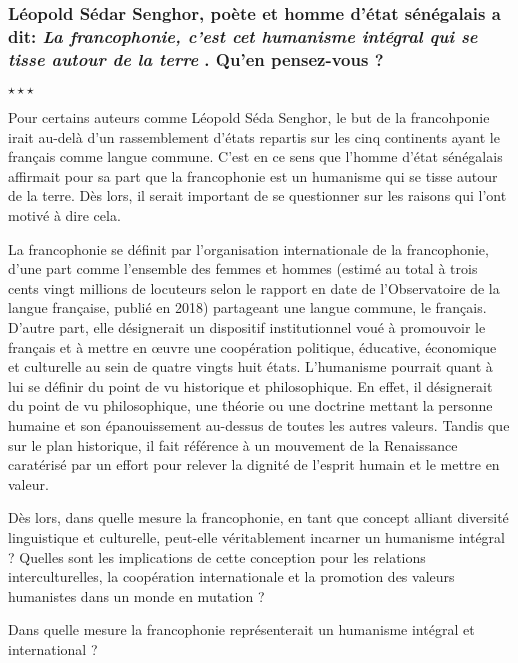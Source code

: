 \newpage \begin{center}
	\subsubsection*{Léopold Sédar Senghor, poète et homme d’état sénégalais a dit: \guillemetleft \textit{La francophonie, c’est cet humanisme intégral qui se tisse autour de la terre} \guillemetright. Qu’en pensez-vous ? }
	$\star \star \star$
\end{center}

Pour certains auteurs comme Léopold Séda Senghor, le but de la francohponie irait au-delà d'un rassemblement d'états repartis sur les cinq continents ayant le français comme langue commune. C'est en ce sens que l'homme d'état sénégalais affirmait pour sa part que la francophonie est un humanisme qui se tisse autour de la terre. Dès lors, il serait important de se questionner sur les raisons qui l'ont motivé à dire cela.

La francophonie se définit par l'organisation internationale de la francophonie, d'une part comme l'ensemble des femmes et hommes (estimé au total à trois cents vingt millions de locuteurs selon le rapport en date de l'Observatoire de la langue française, publié en 2018) partageant une langue commune, le français. D'autre part, elle désignerait un dispositif institutionnel voué à promouvoir le français et à mettre en œuvre une coopération politique, éducative, économique et culturelle au sein de quatre vingts huit états. L'humanisme pourrait quant à lui se définir du point de vu historique et philosophique. En effet, il désignerait du point de vu philosophique, une théorie ou une doctrine mettant la personne humaine et son épanouissement au-dessus de toutes les autres valeurs. Tandis que sur le plan historique, il fait référence à un mouvement de la Renaissance caratérisé par un effort pour relever la dignité de l'esprit humain et le mettre en valeur.

Dès lors, dans quelle mesure la francophonie, en tant que concept alliant diversité linguistique et culturelle, peut-elle véritablement incarner un humanisme intégral ?  Quelles sont les implications de cette conception pour les relations interculturelles, la coopération internationale et la promotion des valeurs humanistes dans un monde en mutation ?

Dans quelle mesure la francophonie représenterait un humanisme intégral et international ?

